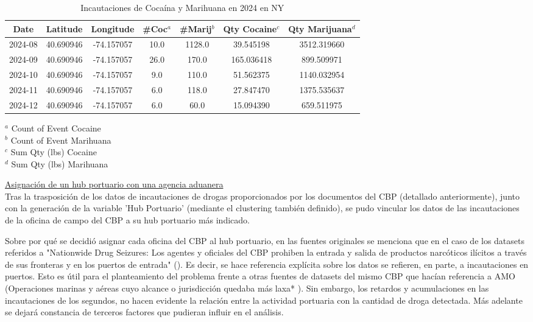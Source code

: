 \documentclass[12pt]{article}
\begin{document}
		\begingroup
		\small
		\begin{table}[H]
			\caption{Incautaciones de Cocaína y Marihuana en 2024 en NY}
			\label{tabla_incautaciones_2024}
			\begin{center}
			\begin{tabular}{|c|c|c|c|c|c|c|}
				\hline
				\textbf{Date} & \textbf{Latitude} & \textbf{Longitude} & \textbf{\#Coc$^a$} & \textbf{\#Marij$^b$} & \textbf{Qty Cocaine$^c$} & \textbf{Qty Marijuana$^d$} \\
				\hline
				2024-08 & 40.690946 & -74.157057 & 10.0 & 1128.0 & 39.545198 & 3512.319660 \\
				\hline
				2024-09 & 40.690946 & -74.157057 & 26.0 & 170.0 & 165.036418 & 899.509971 \\
				\hline
				2024-10 & 40.690946 & -74.157057 & 9.0 & 110.0 & 51.562375 & 1140.032954 \\
				\hline
				2024-11 & 40.690946 & -74.157057 & 6.0 & 118.0 & 27.847470 & 1375.535637 \\
				\hline
				2024-12 & 40.690946 & -74.157057 & 6.0 & 60.0 & 15.094390 & 659.511975 \\
				\hline
			\end{tabular}
			\end{center}
			$^a$ Count of Event Cocaine \\
			$^b$ Count of Event Marihuana \\
			$^c$ Sum Qty (lbs) Cocaine \\ 
			$^d$ Sum Qty (lbs) Marihuana
		\end{table}
		\endgroup
		

		\underline{Asignación de un hub portuario con una agencia aduanera}\\
		Tras la trasposición de los datos de incautaciones de drogas proporcionados por los documentos del CBP (detallado anteriormente), junto con la generación de la variable 'Hub Portuario' (mediante el clustering también definido), se pudo vincular los datos de las incautaciones de la oficina de campo del CBP a su hub portuario más indicado.
		
		Sobre por qué se decidió asignar cada oficina del CBP al hub portuario, en las fuentes originales se menciona que en el caso de los datasets referidos a "Nationwide Drug Seizures: Los agentes y oficiales del CBP prohiben la entrada y salida de productos narcóticos ilícitos a través de sus fronteras y en los puertos de entrada" (\cite {cbp2025drugseizures}). Es decir, se hace referencia explícita sobre los datos se refieren, en parte, a incautaciones en puertos. Esto es útil para el planteamiento del problema frente a otras fuentes de datasets del mismo CBP que hacían referencia a AMO (Operaciones marinas y aéreas cuyo alcance o jurisdicción quedaba más laxa* \cite{cbp2025amodrugseizures}). Sin embargo, los retardos y acumulaciones en las incautaciones de los segundos, no hacen evidente la relación entre la actividad portuaria con la cantidad de droga detectada. Más adelante se dejará constancia de terceros factores que pudieran influir en el análisis.
		
\end{document}
